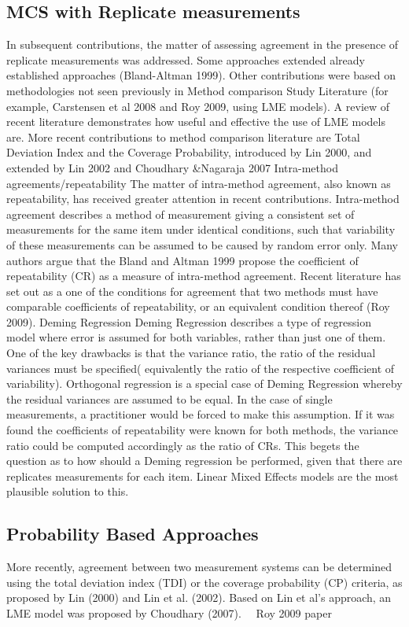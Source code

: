 \subsection*{MCS with Replicate measurements}
In subsequent contributions, the matter of assessing agreement in the presence  of replicate measurements was addressed. Some approaches extended already established approaches (Bland-Altman 1999).  Other contributions were based on methodologies not seen previously in Method comparison Study Literature  (for example, Carstensen et al 2008 and Roy 2009, using LME models). 
A review of recent literature demonstrates how useful and effective the use of LME models are.
More recent contributions to method comparison literature are Total Deviation Index and the Coverage Probability, introduced by Lin 2000, and extended by Lin 2002 and Choudhary &Nagaraja 2007
Intra-method agreements/repeatability
The matter of intra-method agreement, also known as repeatability, has received greater attention in recent contributions. Intra-method agreement describes a method of measurement giving a consistent set of measurements for the same item under identical conditions, such that variability of these measurements can be assumed to be caused by random error only. Many authors argue that the
Bland and Altman 1999 propose the coefficient of repeatability (CR) as a measure of intra-method agreement. Recent literature has set out as a one of the conditions for agreement that two methods must have comparable coefficients of repeatability, or an equivalent condition thereof (Roy 2009).
Deming Regression
Deming Regression describes a type of regression model where error is assumed for both variables, rather than just one of them. One of the key drawbacks is that the variance ratio, the ratio of the residual variances must be specified( equivalently the ratio of the respective coefficient of variability).
Orthogonal regression is a special case of Deming Regression whereby the residual variances are assumed to be equal.  In the case of single measurements, a practitioner would be forced to make this assumption. If it was found the coefficients of repeatability were known for both methods, the variance ratio could be computed accordingly as the ratio of CRs.  
This begets the question as to how should a Deming regression be performed, given that there are replicates measurements for each item. Linear Mixed Effects models are the most plausible solution to this.
\subsection*{Probability Based Approaches}
More recently, agreement between two measurement systems can be determined using the total deviation index (TDI) or the coverage probability (CP) criteria, as proposed by Lin (2000) and Lin et al. (2002). Based on Lin et al's approach, an LME model was proposed by Choudhary (2007). 
Roy 2009 paper

